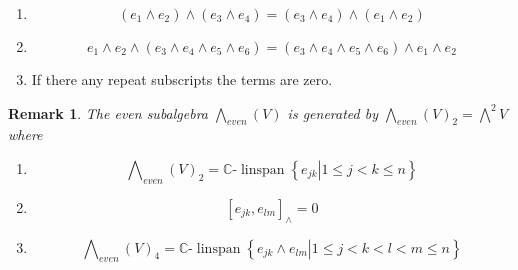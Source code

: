 \documentclass[aps,preprint]{revtex4}%
\newtheorem{remark}[theorem]{Remark}
\begin{document}
\begin{enumerate}
\item
\begin{equation}
\left(  e_{1}\wedge e_{2}\right)  \wedge\left(  e_{3}\wedge e_{4}\right)
=\left(  e_{3}\wedge e_{4}\right)  \wedge\left(  e_{1}\wedge e_{2}\right)
\end{equation}


\item
\begin{equation}
e_{1}\wedge e_{2}\wedge\left(  e_{3}\wedge e_{4}\wedge e_{5}\wedge
e_{6}\right)  =\left(  e_{3}\wedge e_{4}\wedge e_{5}\wedge e_{6}\right)
\wedge e_{1}\wedge e_{2}%
\end{equation}


\item If there any repeat subscripts the terms are zero.
\end{enumerate}

\begin{remark}
The even subalgebra $%
{\textstyle\bigwedge_{even}}
\left(  V\right)  $ is generated by $%
{\textstyle\bigwedge_{even}}
\left(  V\right)  _{2}=%
{\textstyle\bigwedge^{2}}
V$ where

\begin{enumerate}
\item
\begin{equation}%
{\textstyle\bigwedge\nolimits_{even}}
\left(  V\right)  _{2}=\mathbb{C}\text{-}\operatorname{linspan}\left\{
\left.  e_{jk}\right\vert 1\leq j<k\leq n\right\}
\end{equation}


\item
\begin{equation}
\left[  e_{jk},e_{lm}\right]  _{\wedge}=0
\end{equation}


\item
\begin{equation}%
{\textstyle\bigwedge\nolimits_{even}}
\left(  V\right)  _{4}=\mathbb{C}\text{-}\operatorname{linspan}\left\{
\left.  e_{jk}\wedge e_{lm}\right\vert 1\leq j<k<l<m\leq n\right\}
\end{equation}

\end{enumerate}
\end{remark}
\end{document}
